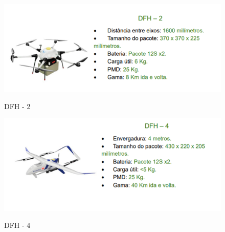 \begin{figure} [!ht]
    {\centering
    \caption{DFH - 2}
    \includegraphics[width=0.9\linewidth]{figuras/drone dfh2.png}
    \label{fig:enter-label}
    }
\end{figure}

\begin{figure} [!ht]
 {   \centering
    \caption{DFH - 4}
    \includegraphics[width=0.9\linewidth]{figuras/drone dfh4.png}
    \label{fig:enter-label}
    }
\end{figure}

